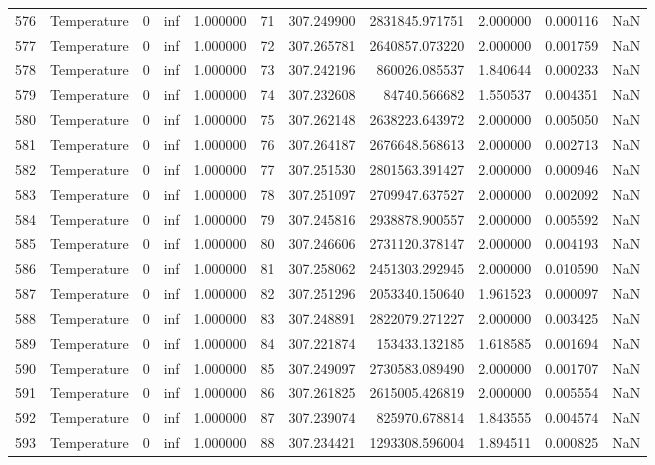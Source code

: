 \begin{tabular}{llrrrrrrrrr}
576 & Temperature & 0 & inf & 1.000000 & 71 & 307.249900 & 2831845.971751 & 2.000000 & 0.000116 & NaN \\
577 & Temperature & 0 & inf & 1.000000 & 72 & 307.265781 & 2640857.073220 & 2.000000 & 0.001759 & NaN \\
578 & Temperature & 0 & inf & 1.000000 & 73 & 307.242196 & 860026.085537 & 1.840644 & 0.000233 & NaN \\
579 & Temperature & 0 & inf & 1.000000 & 74 & 307.232608 & 84740.566682 & 1.550537 & 0.004351 & NaN \\
580 & Temperature & 0 & inf & 1.000000 & 75 & 307.262148 & 2638223.643972 & 2.000000 & 0.005050 & NaN \\
581 & Temperature & 0 & inf & 1.000000 & 76 & 307.264187 & 2676648.568613 & 2.000000 & 0.002713 & NaN \\
582 & Temperature & 0 & inf & 1.000000 & 77 & 307.251530 & 2801563.391427 & 2.000000 & 0.000946 & NaN \\
583 & Temperature & 0 & inf & 1.000000 & 78 & 307.251097 & 2709947.637527 & 2.000000 & 0.002092 & NaN \\
584 & Temperature & 0 & inf & 1.000000 & 79 & 307.245816 & 2938878.900557 & 2.000000 & 0.005592 & NaN \\
585 & Temperature & 0 & inf & 1.000000 & 80 & 307.246606 & 2731120.378147 & 2.000000 & 0.004193 & NaN \\
586 & Temperature & 0 & inf & 1.000000 & 81 & 307.258062 & 2451303.292945 & 2.000000 & 0.010590 & NaN \\
587 & Temperature & 0 & inf & 1.000000 & 82 & 307.251296 & 2053340.150640 & 1.961523 & 0.000097 & NaN \\
588 & Temperature & 0 & inf & 1.000000 & 83 & 307.248891 & 2822079.271227 & 2.000000 & 0.003425 & NaN \\
589 & Temperature & 0 & inf & 1.000000 & 84 & 307.221874 & 153433.132185 & 1.618585 & 0.001694 & NaN \\
590 & Temperature & 0 & inf & 1.000000 & 85 & 307.249097 & 2730583.089490 & 2.000000 & 0.001707 & NaN \\
591 & Temperature & 0 & inf & 1.000000 & 86 & 307.261825 & 2615005.426819 & 2.000000 & 0.005554 & NaN \\
592 & Temperature & 0 & inf & 1.000000 & 87 & 307.239074 & 825970.678814 & 1.843555 & 0.004574 & NaN \\
593 & Temperature & 0 & inf & 1.000000 & 88 & 307.234421 & 1293308.596004 & 1.894511 & 0.000825 & NaN \\

\end{tabular}
